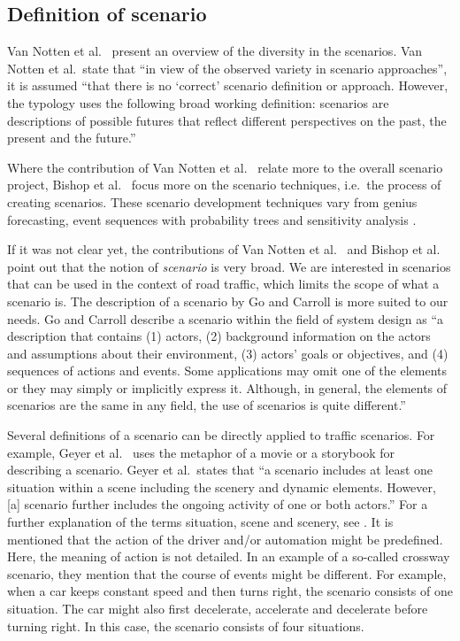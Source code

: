 \subsection{Definition of scenario}
\label{sec:scenario definition}
Van Notten et al.\ \cite{vannotten2003updated} present an overview of the diversity in the scenarios. Van Notten et al.\ state that ``in view of the observed variety in scenario approaches'', it is assumed ``that there is no `correct' scenario definition or approach. However, the typology uses the following broad working definition: scenarios are descriptions of possible futures that reflect different perspectives on the past, the present and the future.''

Where the contribution of Van Notten et al.\ \cite{vannotten2003updated} relate more to the overall scenario project, Bishop et al.\ \cite{bishop2007scentechniques} focus more on the scenario techniques, i.e.\ the process of creating scenarios. These scenario development techniques vary from genius forecasting, event sequences with probability trees and sensitivity analysis \cite{bishop2007scentechniques}.

If it was not clear yet, the contributions of Van Notten et al.\ \cite{vannotten2003updated} and Bishop et al.\ \cite{bishop2007scentechniques} point out that the notion of \emph{scenario} is very broad. We are interested in scenarios that can be used in the context of road traffic, which limits the scope of what a scenario is. The description of a scenario by Go and Carroll \cite{go2004blind} is more suited to our needs.
Go and Carroll \cite{go2004blind} describe a scenario within the field of system design as ``a description that contains (1) actors, (2) background information on the actors and assumptions about their environment, (3) actors' goals or objectives, and (4) sequences of actions and events. Some applications may omit one of the elements or they may simply or implicitly express it. Although, in general, the elements of scenarios are the same in any field, the use of scenarios is quite different.'' 

Several definitions of a scenario can be directly applied to traffic scenarios. For example, Geyer et al.\ \cite{geyer2014} uses the metaphor of a movie or a storybook for describing a scenario. Geyer et al.\ states that ``a scenario includes at least one situation within a scene including the scenery and dynamic elements. However, [a] scenario further includes the ongoing activity of one or both actors.'' For a further explanation of the terms situation, scene and scenery, see \cite{geyer2014}. It is mentioned that the action of the driver and/or automation might be predefined. Here, the meaning of action is not detailed. In an example of a so-called crossway scenario, they mention that the course of events might be different. For example, when a car keeps constant speed and then turns right, the scenario consists of one situation. The car might also first decelerate, accelerate and decelerate before turning right. In this case, the scenario consists of four situations.

